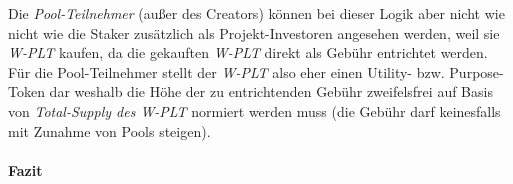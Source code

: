 \begin{Problem}
\vspace{0.5cm}
	
Die \textit{Pool-Teilnehmer} (außer des Creators) können bei dieser Logik aber nicht wie nicht wie die Staker zusätzlich als Projekt-Investoren angesehen werden, weil sie \textit{W-PLT} kaufen, da die gekauften \textit{W-PLT} direkt als Gebühr entrichtet werden. Für die Pool-Teilnehmer stellt der \textit{W-PLT} also eher einen Utility- bzw. Purpose-Token dar weshalb die Höhe der zu entrichtenden Gebühr zweifelsfrei auf Basis von \textit{Total-Supply des W-PLT} normiert werden muss (die Gebühr darf keinesfalls mit Zunahme von Pools steigen).

\end{Problem}

\vspace{0.5cm}


\paragraph{Fazit}
\textbf{ }
\vspace{0.3cm}



